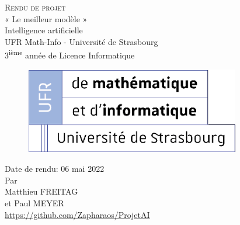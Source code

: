 \documentclass[
	paper=A4,
	twoside=false,
	parskip=full,
	chapterprefix=true,  
	appendixprefix=true,
	12pt,
	headings=normal,
	bibliography=totoc,
	titlepage=on,
	draft=false,
]{scrreprt}
\newcommand{\Autor}{}
\newcommand{\Was}{Rendu de projet}
\newcommand{\Titel}{Rendu de projet}
\newcommand{\AbgabeDatum}{06 mai 2022}
\begin{document}

\begin{titlepage}
    \begin{center}
        \vspace*{2.5cm}
        {\Huge\scshape \Was}\\[1.5cm]
        {\large « Le meilleur modèle »}\\[1cm]
        {\large Intelligence artificielle }\\[1cm]
        {\large UFR Math-Info - Université de Strasbourg}\\[0.5cm]
        {\large 3\textsuperscript{ième} année de Licence Informatique}\\[1cm]
        \begin{figure}[H]
            \centering
            \includegraphics[scale=0.5]{images/logo_unistra.png}
        \end{figure}
        {\large Date de rendu: \AbgabeDatum}\\[2cm]
        {\large Par}\\[0.5cm]
        {\large Matthieu FREITAG}\\[0.15cm]
        {\large et Paul MEYER}\\[3cm]
        {\large \href{https://github.com/Zapharaos/ProjetAI}{https://github.com/Zapharaos/ProjetAI}}
        \vfill
    \end{center}
\end{titlepage}
\clearpage

\pagestyle{plain}

\setcounter{tocdepth}{1}
\end{document}
